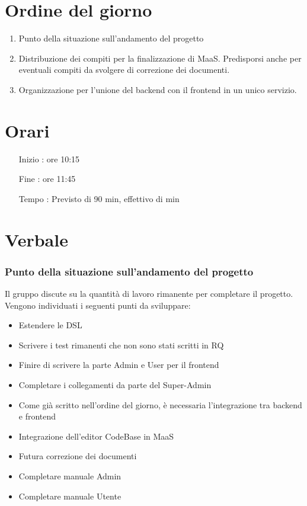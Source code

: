\documentclass[11pt]{meetingmins}
\begin{document}
\maketitle

\section{Ordine del giorno}

\begin{enumerate}

\item Punto della situazione sull'andamento del progetto
\item Distribuzione dei compiti per la finalizzazione di MaaS. Predisporsi anche per eventuali compiti da svolgere di correzione dei documenti.
\item Organizzazione per l'unione del backend con il frontend in un unico servizio.

\end{enumerate}

\section{Orari}

\begin{itemize}
\item[Inizio]: ore 10:15
\item[Fine]: ore 11:45
\item[Tempo]: Previsto di 90 min, effettivo di  min

\end{itemize}

\section{Verbale}

\subsubsection{Punto della situazione sull'andamento del progetto}

Il gruppo discute su la quantità di lavoro rimanente per completare il progetto. Vengono individuati i seguenti punti da sviluppare:
\begin{itemize}

\item Estendere le DSL
\item Scrivere i test rimanenti che non sono stati scritti in RQ
\item Finire di scrivere la parte Admin e User per il frontend
\item Completare i collegamenti da parte del Super-Admin
\item Come già scritto nell'ordine del giorno, è necessaria l'integrazione tra backend e frontend
\item Integrazione dell'editor CodeBase in MaaS
\item Futura correzione dei documenti
\item Completare manuale Admin
\item Completare manuale Utente
\end{itemize}
\end{document}
